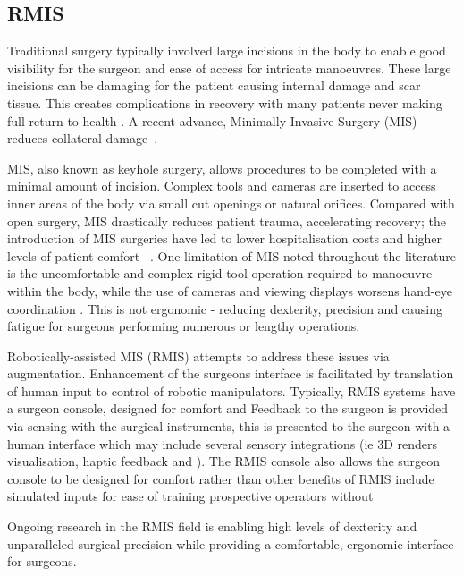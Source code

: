 \documentclass[english]{sobraep}
\begin{document}
\subsection{RMIS}
Traditional surgery typically involved large incisions in the body to enable good visibility for the surgeon and ease of access for intricate manoeuvres. These large incisions can be damaging for the patient causing internal damage and scar tissue. This creates complications in recovery with many patients never making full return to health \cite{Nezhat2021}. A recent advance, Minimally Invasive Surgery (MIS) reduces collateral damage~\cite{laparoscopic-vs-open, intro-rmis}. 

MIS, also known as keyhole surgery, allows procedures to be completed with a minimal amount of incision. Complex tools and cameras are inserted to access inner areas of the body via small cut openings or natural orifices. Compared with open surgery, MIS drastically reduces patient trauma, accelerating recovery; the introduction of MIS surgeries have led to lower hospitalisation costs and higher levels of patient comfort ~\cite{laparoscopic-vs-open,intro-rmis}. One limitation of MIS noted throughout the literature is the uncomfortable and complex rigid tool operation required to manoeuvre within the body, while the use of cameras and viewing displays worsens hand-eye coordination \cite{intro-rmis, force-sensing}. This is not ergonomic - reducing dexterity, precision and causing fatigue for surgeons performing numerous or lengthy operations.

Robotically-assisted MIS (RMIS) attempts to address these issues via augmentation. Enhancement of the surgeons interface is facilitated by translation of human input to control of robotic manipulators. Typically, RMIS systems have a surgeon console, designed for comfort and Feedback to the surgeon is provided via sensing with the surgical instruments, this is presented to the surgeon with a human interface which may include several sensory integrations (ie 3D renders visualisation, haptic feedback and ).  The RMIS console also allows the surgeon console to be designed for comfort rather than other benefits of RMIS include simulated inputs for ease of training prospective operators without  

Ongoing research in the RMIS field is enabling high levels of dexterity and unparalleled surgical precision while providing a comfortable, ergonomic interface for surgeons.  
\end{document}
